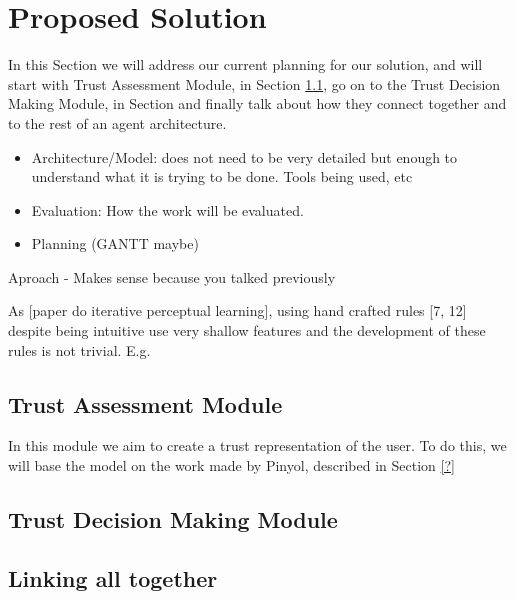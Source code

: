 \section{Proposed Solution}
\label{sec:Solution}
In this Section we will address our current planning for our solution, and will start with Trust Assessment Module, in Section \ref{subsec:Solution:Trust Assessment Module}, go on to the Trust Decision Making Module, in Section and finally talk about how they connect together and to the rest of an agent architecture.



\begin{itemize}
	\item Architecture/Model: does not need to be very detailed but enough to understand what it is trying to be done. Tools being used, etc
	\item Evaluation: How the work will be evaluated.	
	\item Planning (GANTT maybe)	
\end{itemize}Aproach - Makes sense because you talked previously


As [paper do iterative perceptual learning], using hand crafted rules [7, 12] despite being intuitive use very shallow features and the development of these rules is not trivial.
E.g.

\subsection{Trust Assessment Module}
\label{subsec:Solution:Trust Assessment Module}
In this module we aim to create a trust representation of the user. To do this, we will base the model on the work made by Pinyol\cite{Pinyol2009}, described in Section \ref{?}



\subsection{Trust Decision Making Module}
\label{subsec:Solution:Trust Decision Making Module}

\subsection{Linking all together}
\label{subsec:Solution:Linking all together}